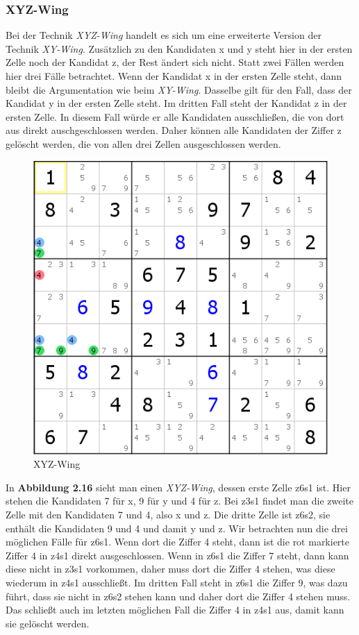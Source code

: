 \newpage
\subsubsection{XYZ-Wing}
Bei der Technik \textit{XYZ-Wing} handelt es sich um eine erweiterte Version der Technik \textit{XY-Wing}. Zusätzlich zu den Kandidaten x und y steht hier in der ersten Zelle noch der Kandidat z, der Rest ändert sich nicht. Statt zwei Fällen werden hier drei Fälle betrachtet. Wenn der Kandidat x in der ersten Zelle steht, dann bleibt die Argumentation wie beim \textit{XY-Wing}. Dasselbe gilt für den Fall, dass der Kandidat y in der ersten Zelle steht. Im dritten Fall steht der Kandidat z in der ersten Zelle. In diesem Fall würde er alle Kandidaten ausschließen, die von dort aus direkt auschgeschlossen werden. Daher können alle Kandidaten der Ziffer z gelöscht werden, die von allen drei Zellen ausgeschlossen werden.

\begin{figure}[h]
\begin{center}
\includegraphics{./img/XYZ_Wing.png}
\caption{XYZ-Wing}
\end{center}
\end{figure}

\noindent In \textbf{Abbildung 2.16} sieht man einen \textit{XYZ-Wing}, dessen erste Zelle z6s1 ist. Hier stehen die Kandidaten 7 für x, 9 für y und 4 für z. Bei z3s1 findet man die zweite Zelle mit den Kandidaten 7 und 4, also x und z. Die dritte Zelle ist z6s2, sie enthält die Kandidaten 9 und 4 und damit y und z. Wir betrachten nun die drei möglichen Fälle für z6s1. Wenn dort die Ziffer 4 steht, dann ist die rot markierte Ziffer 4 in z4s1 direkt ausgeschlossen. Wenn in z6s1 die Ziffer 7 steht, dann kann diese nicht in z3s1 vorkommen, daher muss dort die Ziffer 4 stehen, was diese wiederum in z4s1 ausschließt. Im dritten Fall steht in z6s1 die Ziffer 9, was dazu führt, dass sie nicht in z6s2 stehen kann und daher dort die Ziffer 4 stehen muss. Das schließt auch im letzten möglichen Fall die Ziffer 4 in z4s1 aus, damit kann sie gelöscht werden.